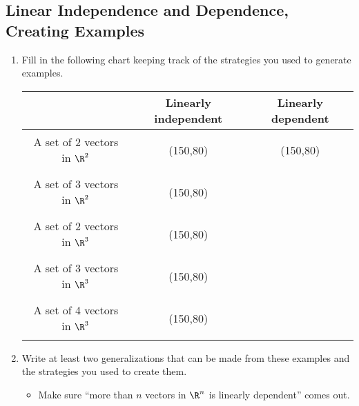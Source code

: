 \begin{iola}
\section*{Linear Independence and Dependence, Creating Examples}
\question


\begin{enumerate}
	\item Fill in the following chart keeping track of the strategies you used to generate
examples.

\vspace{2mm}

\begin{center}
	\newcommand\emptybox{\begin{bookonly}\makebox(150,80){}\end{bookonly}}
\begin{tabular}{|c|c|c|}
	\hline
	&Linearly independent & Linearly dependent \\
	\hline
	A set of 2 vectors in $\R^2$ &\emptybox&\emptybox\\
	\hline
	A set of 3 vectors in $\R^2$ &\emptybox&\\
	\hline
	A set of 2 vectors in $\R^3$ &\emptybox&\\
	\hline
	A set of 3 vectors in $\R^3$ &\emptybox&\\
	\hline
	A set of 4 vectors in $\R^3$ &\emptybox&\\
	\hline
\end{tabular}
\end{center}

		\item Write at least two generalizations that can
			be made from these examples and the strategies you
			used to create them.
	\begin{annotation}
		\begin{notes}
			\begin{itemize}
				\item Make sure ``more than $n$ vectors in $\R^n$
					is linearly dependent'' comes out.
			\end{itemize}
		\end{notes}
	\end{annotation}

\end{enumerate}

\end{iola}


